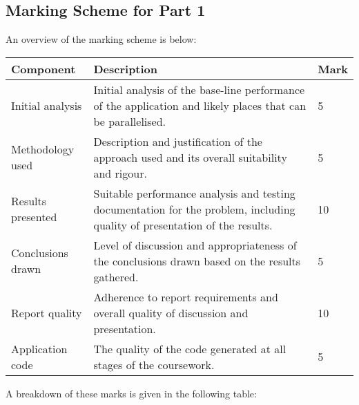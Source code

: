 \documentclass[a4paper, 12pt]{article}
\begin{document}
\subsection*{Marking Scheme for Part 1}

An overview of the marking scheme is below:

\begin{table}[H]
	\centering
	\begin{tabularx}{\textwidth}{|l|X|l|}
		\hline
		\textbf{Component} & \textbf{Description} & \textbf{Mark} \\
		\hline
		Initial analysis & Initial analysis of the base-line performance of the application and likely places that can be parallelised. & 5 \\
		\hline
		Methodology used & Description and justification of the approach used and its overall suitability and rigour. & 5 \\
		\hline
		Results presented & Suitable performance analysis and testing documentation for the problem, including quality of presentation of the results. & 10 \\
		\hline
		Conclusions drawn & Level of discussion and appropriateness of the conclusions drawn based on the results gathered. & 5 \\
		\hline
		Report quality & Adherence to report requirements and overall quality of discussion and presentation. &	10 \\
		\hline
		Application code & The quality of the code generated at all stages of the coursework. & 5 \\
		\hline
	\end{tabularx}
\end{table}

A breakdown of these marks is given in the following table:
\end{document}
